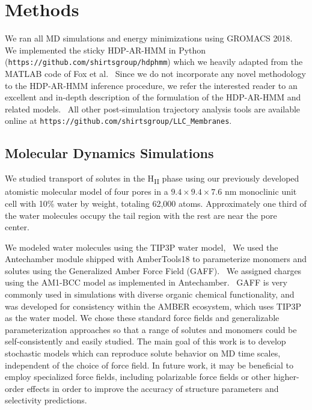 \documentclass[journal=jpcbfk,manuscript=article]{achemso}
\begin{document}
  \section{Methods}
    
  We ran all MD simulations and energy minimizations using GROMACS 2018.~\cite{bekker_gromacs:_1993,berendsen_gromacs:_1995,van_der_spoel_gromacs:_2005,hess_gromacs_2008}  
  We implemented the sticky HDP-AR-HMM in Python 
  (\texttt{https://github.com/shirtsgroup/hdphmm}) which we heavily adapted from
  the MATLAB code of Fox et al.~\cite{fox_nonparametric_2009} Since we do not incorporate
  any novel methodology to the HDP-AR-HMM inference procedure, we refer the 
  interested reader to an excellent and in-depth description of the formulation of
  the HDP-AR-HMM and related models.~\cite{fox_bayesian_2010} 
  All other post-simulation trajectory analysis tools are available online at
  \texttt{https://github.com/shirtsgroup/LLC\_Membranes}.

  \subsection{Molecular Dynamics Simulations}

  We studied transport of solutes in the H\textsubscript{II} phase using our
  previously developed atomistic molecular model of four pores in a $9.4\times9.4\times7.6$ nm 
  monoclinic unit cell with 10\% water by weight, totaling 62,000 atoms. Approximately
  one third of the water molecules occupy the tail region with the rest are near the
  pore center.~\cite{coscia_chemically_2019}

  We modeled water molecules using the TIP3P water model,~\cite{jorgensen_comparison_1983}
  We used the Antechamber module shipped with AmberTools18 to parameterize monomers and 
  solutes using the Generalized Amber Force Field (GAFF).~\cite{wang_development_2004} We 
  assigned charges using the AM1-BCC model as implemented in Antechamber.~\cite{jakalian_fast_2000,jakalian_fast_2002}
  GAFF is very commonly used in simulations with diverse organic chemical functionality, 
  and was developed for consistency within the AMBER ecosystem, which uses TIP3P as the
  water model. We chose these standard force fields and generalizable parameterization 
  approaches so that a range of solutes and monomers could be self-consistently and easily 
  studied. The main goal of this work is to develop stochastic models which can reproduce
  solute behavior on MD time scales, independent of the choice of force field. In future 
  work, it may be beneficial to employ specialized force fields, including polarizable 
  force fields or other higher-order effects in order to improve the accuracy of structure 
  parameters and selectivity predictions.
    
\end{document}
